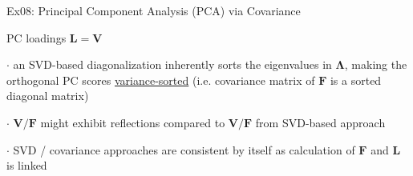\documentclass[mathserif, aspectratio=1610]{intbeamer}
\begin{document}
\begin{frame}[t]{Ex08: Principal Component Analysis (PCA) via Covariance}
\begin{minipage}[t]{0.49\textwidth}
PC loadings $\bm{L} = \bm{V}$

\end{minipage}

\vspace{0.5em}

$\cdot$ an SVD-based diagonalization inherently sorts the eigenvalues in $\bm{\Lambda}$, making the orthogonal PC scores \underline{variance-sorted} (i.e. covariance matrix of $\bm{F}$ is a sorted diagonal matrix)

$\cdot$ $\bm{V} / \bm{F}$ might exhibit reflections compared to $\bm{V} / \bm{F}$ from SVD-based approach

$\cdot$ SVD / covariance approaches are consistent by itself as calculation of $\bm{F}$ and $\bm{L}$ is linked

\end{frame}
\end{document}
